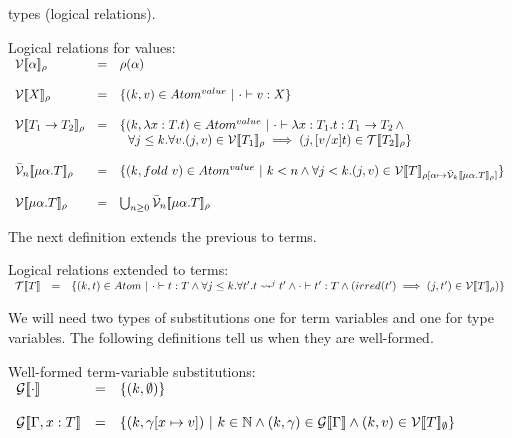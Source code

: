 types (logical relations).  
\begin{definition}
  \label{def:logical_relations}
  Logical relations for values: \\
  \begin{math}
    \begin{array}{lllll}
      \vinterp{\alpha}_\rho & = & \rho(\alpha) \\
      & \\
      \vinterp{X}_\rho & = &  \{ (k,v) \in Atom^{value}\ |\ \cdot \vdash v : X \} \\
      & \\
      \vinterp{T_1 \to T_2}_\rho & = & \{ (k, \lambda x:T.t) \in Atom^{value}\ |\ 
      \cdot \vdash \lambda x:T_1.t : T_1 \to T_2 \,\land \\
      & & \,\,\,\,\forall j \leq k.\forall v.(j, v) \in \vinterp{T_1}_\rho \implies 
              (j, [v/x]t) \in \tinterp{T_2}_{\rho} \}\\
      & \\
      \vbinterp{n}{\mu \alpha.T}_\rho & = & \{ (k,fold\ v) \in Atom^{value}\ |\ 
        k < n \land \forall j < k.(j,v) \in 
        \vinterp{T}_{\rho[\alpha \mapsto \vbinterp{k}{\mu \alpha.T}_\rho]}\}\\
      & \\
      \vinterp{\mu \alpha.T}_\rho & = & \bigcup_{n \geq 0} \vbinterp{n}{\mu \alpha.T}_\rho
    \end{array}
  \end{math}
\end{definition}
\noindent
The next definition extends the previous to terms.
\begin{definition}
  \label{def:lr_extended_to_terms}
    Logical relations extended to terms:\\
  \begin{math}
    \begin{array}{lll}
      \mathcal{T}[\negthinspace[T]\negthinspace] & = & \{ (k,t) \in Atom\ |\ \cdot \vdash t:T \land 
      \forall j \leq k.\forall t'.t \rightsquigarrow^j t' \land \cdot \vdash t':T \land 
      (irred(t') \implies (j,t') \in \mathcal{V}[\negthinspace[T]\negthinspace]_\rho) \}
    \end{array}
  \end{math}
\end{definition}
\noindent
We will need two types of substitutions one for term variables and one for type variables.
The following definitions tell us when they are well-formed.
\begin{definition}
  \label{def:well-formed_term_var_subs}
  Well-formed term-variable substitutions:\\
  \begin{math}
    \begin{array}{lllll}
      \ginterp{\cdot} & = & \{ (k,\emptyset) \}\\
      & \\
      \ginterp{\Gamma,x:T} & = & 
      \{ (k, \gamma[x \mapsto v])\ |\ k \in \nat \land (k, \gamma) \in \ginterp{\Gamma} \land 
      (k,v) \in \vinterp{T}_\emptyset \}
    \end{array}
  \end{math}
\end{definition}

